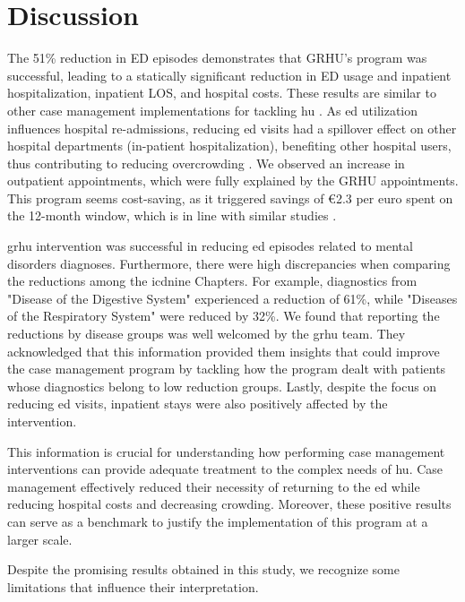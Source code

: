 \documentclass{bmcart}
\begin{document}
\section*{Discussion}
The 51\% reduction in ED episodes demonstrates that GRHU's program was successful, leading to a statically significant reduction in ED usage and inpatient hospitalization, inpatient LOS, and hospital costs.
These results are similar to other case management implementations for tackling \gls{hu} \cite{grover_case_2018,abello_care_2012}.
As \gls{ed} utilization influences hospital re-admissions, reducing \gls{ed} visits had a spillover effect on other hospital departments (in-patient hospitalization), benefiting other hospital users, thus contributing to reducing overcrowding \cite{navratil-strawn_emergency_2014, shumway_cost-effectiveness_2008}.
We observed an increase in outpatient appointments, which were fully explained by the  GRHU appointments. 
This program seems cost-saving, as it triggered savings of €2.3 per euro spent on the 12-month window, which is in line with similar studies \cite{navratil-strawn_emergency_2014}.
\par \gls{grhu} intervention was successful in reducing \gls{ed} episodes related to mental disorders diagnoses.
Furthermore, there were high discrepancies when comparing the reductions among the \gls{icdnine} Chapters. 
For example, diagnostics from "Disease of the Digestive System" experienced a reduction of 61\%, while "Diseases of the Respiratory System" were reduced by 32\%.
We found that reporting the reductions by disease groups was well welcomed by the \gls{grhu} team. 
They acknowledged that this information provided them insights that could improve the case management program by tackling how the program dealt with patients whose diagnostics belong to low reduction groups.
Lastly, despite the focus on reducing \gls{ed} visits, inpatient stays were also positively affected by the intervention.
\par This information is crucial for understanding how performing case management interventions can provide adequate treatment to the complex needs of \gls{hu}.
Case management effectively reduced their necessity of returning to the \gls{ed} while reducing hospital costs and decreasing crowding.
Moreover, these positive results can serve as a benchmark to justify the implementation of this program at a larger scale. 
\par Despite the promising results obtained in this study, we recognize some limitations that influence their interpretation. 
\end{document}
